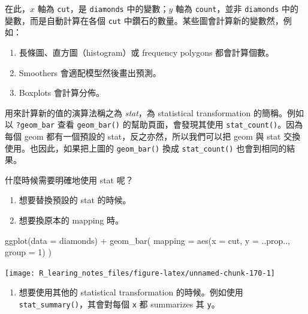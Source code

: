 \documentclass[
]{book}
\newenvironment{Shaded}{\begin{snugshade}}{\end{snugshade}}
\newcommand{\AttributeTok}[1]{\textcolor[rgb]{0.77,0.63,0.00}{#1}}
\newcommand{\DecValTok}[1]{\textcolor[rgb]{0.00,0.00,0.81}{#1}}
\newcommand{\FunctionTok}[1]{\textcolor[rgb]{0.00,0.00,0.00}{#1}}
\newcommand{\NormalTok}[1]{#1}
\newcommand{\SpecialCharTok}[1]{\textcolor[rgb]{0.00,0.00,0.00}{#1}}
\providecommand{\tightlist}{%
  \setlength{\itemsep}{0pt}\setlength{\parskip}{0pt}}
\theoremstyle{definition}
\theoremstyle{remark}
\begin{document}
在此，\(x\) 軸為 \texttt{cut}，是 \texttt{diamonds} 中的變數；\(y\) 軸為 \texttt{count}，並非 \texttt{diamonds} 中的變數，而是自動計算在各個 \texttt{cut} 中鑽石的數量。某些圖會計算新的變數然，例如：

\begin{enumerate}
\def\labelenumi{\arabic{enumi}.}
\tightlist
\item
  長條圖、直方圖（histogram）或 frequency polygons 都會計算個數。
\item
  Smoothers 會適配模型然後畫出預測。
\item
  Boxplots 會計算分佈。
\end{enumerate}

用來計算新的值的演算法稱之為 \emph{stat}，為 statistical transformation 的簡稱。例如以 \texttt{?geom\_bar} 查看 \texttt{geom\_bar()} 的幫助頁面，會發現其使用 \texttt{stat\_count()}。因為每個 geom 都有一個預設的 stat，反之亦然，所以我們可以把 geom 與 stat 交換使用。也因此，如果把上圖的 \texttt{geom\_bar()} 換成 \texttt{stat\_count()} 也會到相同的結果。

什麼時候需要明確地使用 stat 呢？

\begin{enumerate}
\def\labelenumi{\arabic{enumi}.}
\item
  想要替換預設的 stat 的時候。
\item
  想要換原本的 mapping 時。
\end{enumerate}

\begin{Shaded}
\begin{Highlighting}[]
\FunctionTok{ggplot}\NormalTok{(}\AttributeTok{data =}\NormalTok{ diamonds) }\SpecialCharTok{+}
  \FunctionTok{geom\_bar}\NormalTok{(}
    \AttributeTok{mapping =} \FunctionTok{aes}\NormalTok{(}\AttributeTok{x =}\NormalTok{ cut, }\AttributeTok{y =}\NormalTok{ ..prop.., }\AttributeTok{group =} \DecValTok{1}\NormalTok{)}
\NormalTok{  )}
\end{Highlighting}
\end{Shaded}

\begin{center}\texttt{[image: R\_learing\_notes\_files/figure-latex/unnamed-chunk-170-1]} \end{center}

\begin{enumerate}
\def\labelenumi{\arabic{enumi}.}
\setcounter{enumi}{2}
\tightlist
\item
  想要使用其他的 statistical transformation 的時候。例如使用 \texttt{stat\_summary()}，其會對每個 \texttt{x} 都 summarizes 其 \texttt{y}。
\end{enumerate}
\end{document}
